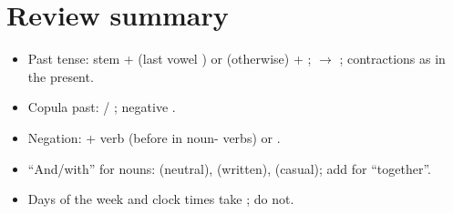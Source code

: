 \section*{Review summary}
\begin{itemize}
  \item Past tense: stem +  (last vowel ) or  (otherwise) +
        ;  $\to$ ; contractions as in the present.
  \item Copula past:  / ; negative .
  \item Negation:  + verb (before  in noun- verbs) or
        .
  \item ``And/with'' for nouns:  (neutral),  (written),
         (casual); add  for ``together''.
  \item Days of the week and clock times take ;  do not.
\end{itemize}
